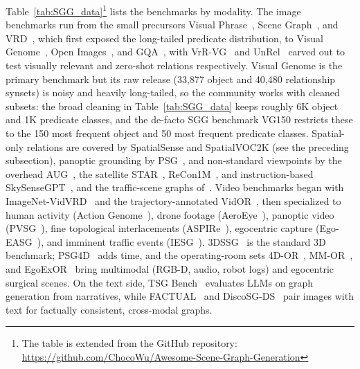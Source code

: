 Table~\ref{tab:SGG_data}\footnote{The table is extended from the GitHub repository: \url{https://github.com/ChocoWu/Awesome-Scene-Graph-Generation}} lists the benchmarks by modality.
The image benchmarks run from the small precursors Visual Phrase~\cite{Sadeghi2011VisualPhrases}, Scene Graph~\cite{johnson2015image}, and VRD~\cite{lu2016visual}, which first exposed the long-tailed predicate distribution, to Visual Genome~\cite{krishna2017visual}, Open Images~\cite{kuznetsova2020open}, and GQA~\cite{hudson2019gqa}, with VrR-VG~\cite{liang2019vrr} and UnRel~\cite{peyre2017weakly} carved out to test visually relevant and zero-shot relations respectively.
Visual Genome is the primary benchmark but its raw release (33,877 object and 40,480 relationship synsets) is noisy and heavily long-tailed, so the community works with cleaned subsets: the broad cleaning in Table~\ref{tab:SGG_data} keeps roughly 6K object and 1K predicate classes, and the de-facto SGG benchmark VG150 restricts these to the 150 most frequent object and 50 most frequent predicate classes.
Spatial-only relations are covered by SpatialSense and SpatialVOC2K (see the preceding subsection), panoptic grounding by PSG~\cite{yang2022panoptic}, and non-standard viewpoints by the overhead AUG~\cite{li2024aug}, the satellite STAR~\cite{li2025star}, ReCon1M~\cite{yan2025recon1m}, and instruction-based SkySenseGPT~\cite{luo2024skysensegpt}, and the traffic-scene graphs of~\cite{zhou2022toward}.
Video benchmarks began with ImageNet-VidVRD~\cite{shang2017video} and the trajectory-annotated VidOR~\cite{shang2019annotating}, then specialized to human activity (Action Genome~\cite{ji2020action}), drone footage (AeroEye~\cite{nguyen2024cyclo}), panoptic video (PVSG~\cite{yang2023panoptic}), fine topological interlacements (ASPIRe~\cite{nguyen2024hig}), egocentric capture (Ego-EASG~\cite{rodin2024action}), and imminent traffic events (IESG~\cite{liu2023learning}).
3DSSG~\cite{wald2020learning} is the standard 3D benchmark; PSG4D~\cite{yang20234d} adds time, and the operating-room sets 4D-OR~\cite{ozsoy20224d}, MM-OR~\cite{ozsoy2025mm}, and EgoExOR~\cite{ozsoy2025egoexor} bring multimodal (RGB-D, audio, robot logs) and egocentric surgical scenes.
On the text side, TSG Bench~\cite{yang2025llm} evaluates LLMs on graph generation from narratives, while FACTUAL~\cite{li2023factual} and DiscoSG-DS~\cite{lin2025discosg} pair images with text for factually consistent, cross-modal graphs.

